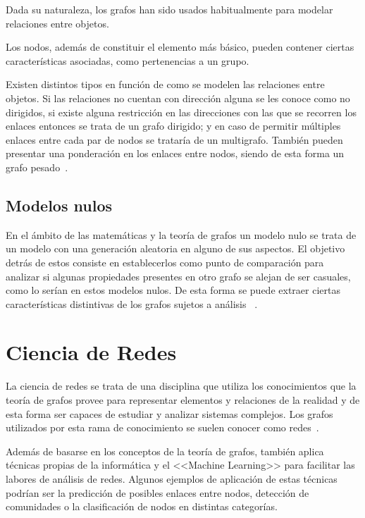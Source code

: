 Dada su naturaleza, los grafos han sido usados habitualmente para modelar relaciones entre objetos.

Los nodos, además de constituir el elemento más básico, pueden contener ciertas características asociadas, como pertenencias a un grupo.

Existen distintos tipos en función de como se modelen las relaciones entre objetos. Si las relaciones no cuentan con dirección alguna se les conoce como no dirigidos, si existe alguna restricción en las direcciones con las que se recorren los enlaces entonces se trata de un grafo dirigido; y en caso de permitir múltiples enlaces entre cada par de nodos se trataría de un multigrafo. También pueden presentar una ponderación en los enlaces entre nodos, siendo de esta forma un grafo pesado~\cite{enwiki:1171835383}.

\subsection{Modelos nulos}

En el ámbito de las matemáticas y la teoría de grafos un modelo nulo se trata de un modelo con una generación aleatoria en alguno de sus aspectos. El objetivo detrás de estos consiste en establecerlos como punto de comparación para analizar si algunas propiedades presentes en otro grafo se alejan de ser casuales, como lo serían en estos modelos nulos. De esta forma se puede extraer ciertas características distintivas de los grafos sujetos a análisis ~\cite{enwiki:1169838323}.

\section{Ciencia de Redes}

La ciencia de redes se trata de una disciplina que utiliza los conocimientos que la teoría de grafos provee para representar elementos y relaciones de la realidad y de esta forma ser capaces de estudiar y analizar sistemas complejos. Los grafos utilizados por esta rama de conocimiento se suelen conocer como redes~\cite{eswiki:151888116}.

Además de basarse en los conceptos de la teoría de grafos, también aplica técnicas propias de la informática y el <<Machine Learning>> para facilitar las labores de análisis de redes. Algunos ejemplos de aplicación de estas técnicas podrían ser la predicción de posibles enlaces entre nodos, detección de comunidades o la clasificación de nodos en distintas categorías.

